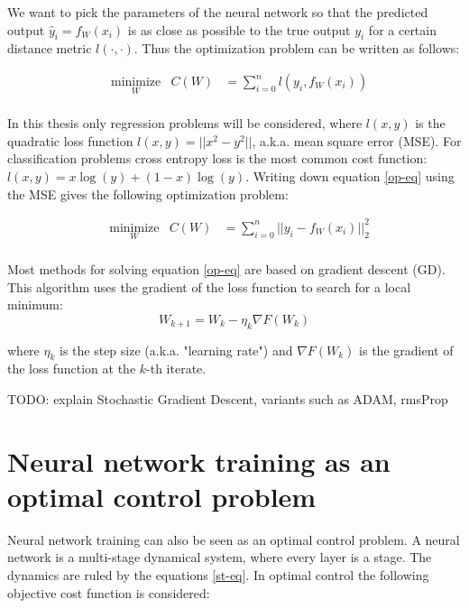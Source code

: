 We want to pick the parameters of the neural network so that the predicted output $\hat{y}_i = f_W(x_i)$ is as close as possible to the true output $y_i$ for a certain distance metric $\mathit{l(\cdot,\cdot)}$. Thus the optimization problem can be written as follows:

\begin{equation}
\begin{aligned}
& \underset{W}{\text{minimize}}
& C(W) &= \sum\limits_{i=0}^{n}l(y_i,f_W(x_i)) \\
\end{aligned}
\label{op-eq}
\end{equation}

In this thesis only regression problems will be considered, where $l(x,y)$ is the quadratic loss function $l(x,y) = ||x^2-y^2||$, a.k.a. mean square error (MSE). For classification problems cross entropy loss is the most common cost function: $l(x,y) = x\log(y)+(1-x)\log(y)$. Writing down equation \ref{op-eq} using the MSE gives the following optimization problem:

\begin{equation}
\begin{aligned}
& \underset{W}{\text{minimize}}
& C(W) &= \sum\limits_{i=0}^{n}||y_i - f_W(x_i)||^2_2 \\
\end{aligned}
\label{op2-eq}
\end{equation}

Most methods for solving equation \ref{op-eq} are based on gradient descent (GD). This algorithm uses the gradient of the loss function to search for a local minimum:
\begin{equation}
W_{k+1} = W_{k} - \eta_k\nabla F(W_k)
\label{gd-eq}
\end{equation}

where $\eta_k$ is the step size (a.k.a. "learning rate") and $\nabla F(W_k)$ is the gradient of the loss function at the $k$-th iterate.

TODO: explain Stochastic Gradient Descent, variants such as ADAM, rmsProp

\section{Neural network training as an optimal control problem}
Neural network training can also be seen as an optimal control problem. A neural network is a multi-stage dynamical system, where every layer is a stage. The dynamics are ruled by the equations \ref{st-eq}. In optimal control the following objective cost function is considered:

